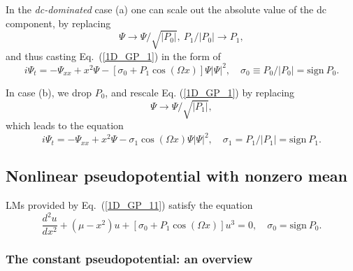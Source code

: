 \documentclass[aps,preprint,showkeys,
]{revtex4}
\begin{document}
In the \textit{dc-dominated} case (a) one can scale out the absolute value
of the dc component, by replacing
\begin{equation}
{\Psi \rightarrow \Psi /\sqrt{|P_{0}|},~}P_{1}/|P_{0}|\rightarrow P_{1},
\label{Rescal02}
\end{equation}%
and thus casting Eq.~(\ref{1D_GP_1}) in the form of
\begin{equation}
i\Psi _{t}=-\Psi _{xx}+x^{2}\Psi {-}\left[ \sigma _{0}+P_{1}\cos \left(
\Omega x\right) \right] \Psi |\Psi |^{2},\quad {\sigma _{0}\equiv
P_{0}/|P_{0}|=\mathrm{sign}~P_{0}.}  \label{1D_GP_11}
\end{equation}

In case (b), we drop $P_{0}$, and rescale Eq. (\ref{1D_GP_1}) by replacing
\begin{equation}
{\Psi \rightarrow \Psi /\sqrt{|P_{1}|}},
\end{equation}%
which leads to the equation
\begin{equation}
i\Psi _{t}=-\Psi _{xx}+x^{2}\Psi {-}\sigma _{1}\cos \left( \Omega x\right)
\Psi |\Psi |^{2},\quad \sigma _{1}=P_{1}/|P_{1}|=\mathrm{sign}~P_{1}.
\label{1D_GP_12}
\end{equation}%
%
%

\subsection{Nonlinear pseudopotential with nonzero mean}

\label{NonZM}

LMs provided by Eq.~(\ref{1D_GP_11}) satisfy the equation
\begin{equation}
\frac{d^{2}u}{dx^{2}}+(\mu -x^{2})u+\left[ \sigma _{0}+P_{1}\cos \left(
\Omega x\right) \right] u^{3}=0,\quad \sigma _{0}=\mathrm{sign}~P_{0}.
\label{eq1_1}
\end{equation}

\subsubsection{The constant pseudopotential: an overview}

\label{Review_const}
\end{document}
